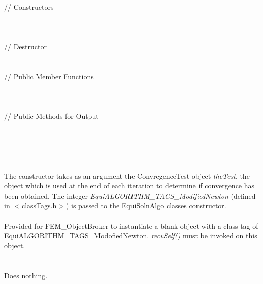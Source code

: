  \\ 
\indent // Constructors \\ 
\\ 
\\ \\
\indent // Destructor \\
\\  \\
\indent // Public Member Functions \\
 \\
 \\\\
\indent // Public Methods  for Output \\
\\ 
\\ 
 \\


 \\ 
\\ 
The constructor takes as an argument the ConvregenceTest object {\em
theTest}, the object which is used at the end of each iteration to
determine if convergence has been obtained. The
integer {\em EquiALGORITHM\_TAGS\_ModifiedNewton} (defined in
$<$classTags.h$>$) is passed to the EquiSolnAlgo classes
constructor. \\ 

\\
Provided for FEM\_ObjectBroker to instantiate a blank object with a
class tag of EquiALGORITHM\_TAGS\_ModofiedNewton. {\em
recvSelf()} must be invoked on this object. \\

 \\
\\ 
Does nothing. \\

